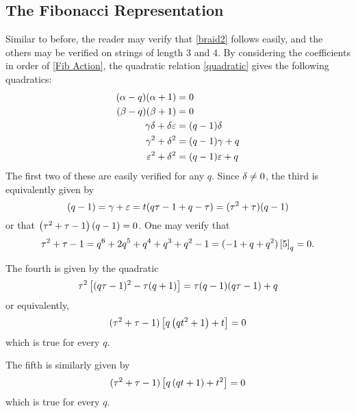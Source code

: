 \documentclass{amsart}
\begin{document}
\subsection{The Fibonacci Representation} 
\label{Fib Relations}
Similar to before, the reader may verify that \eqref{braid2} follows easily, and the others may be verified on strings of length 3 and 4.
By considering the coefficients in order of \eqref{Fib Action}, the quadratic relation \eqref{quadratic} gives the following quadratics:
\begin{equation}
  \begin{split}
    (\alpha - q)(\alpha + 1) &= 0\\
    (\beta - q)(\beta + 1) &= 0\\
    \gamma\delta + \delta\varepsilon &= (q-1)\delta\\
    \gamma^2 + \delta^2 &= (q -1)\gamma + q\\
    \varepsilon^2 + \delta^2 &= (q -1)\varepsilon + q
  \end{split}
\end{equation}
The first two of these are easily verified for any $q$.
Since $\delta \neq 0$, the third is equivalently given by
\[
  (q - 1) = \gamma + \varepsilon = t(q\tau - 1 + q - \tau) = (\tau^2 + \tau)(q - 1)
\]
or that $\left( \tau^2 + \tau - 1 \right)(q-1) = 0$.
One may verify that \[\tau^2 + \tau - 1 = q^6 + 2q^5 + q^4 + q^3 + q^2 - 1 = (-1+q+q^2)\left[ 5 \right]_q = 0.\]

The fourth is given by the quadratic
\[
  \tau^2\left[ (q\tau-1)^2 - \tau(q+1) \right] = \tau(q-1)(q\tau - 1) + q
\]
or equivalently,
\[
  (\tau^2 + \tau - 1)\left[ q\left( qt^2 + 1 \right) + t \right] = 0
\]
which is true for every $q$.

The fifth is similarly given by
\[
  (\tau^2 + \tau - 1)\left[ q\left( qt + 1 \right) + t^2 \right] = 0 
\]
which is true for every $q$.
\end{document}
